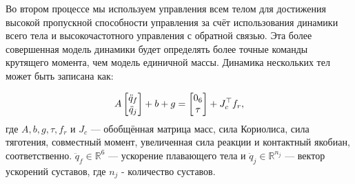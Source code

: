 Во втором процессе мы используем управления всем телом для достижения высокой пропускной способности управления за счёт использования динамики всего тела и высокочастотного управления с обратной связью. Эта более совершенная модель динамики будет определять более точные команды крутящего момента, чем модель единичной массы. Динамика нескольких тел может быть записана как:

\begin{equation}
	A \begin{bmatrix}
		\ddot{{q}}_f \\ \ddot{{q}}_j
	\end{bmatrix}
	+ b +g =
	\begin{bmatrix}
		0_6 \\ \tau
	\end{bmatrix} +
	J_c^\top f_r,
\end{equation}
где $A, b, g, \tau, f_r $ и $J_c$ --- обобщённая матрица масс, сила Кориолиса, сила тяготения, совместный момент, увеличенная сила реакции и контактный якобиан, соответственно. $\ddot{{q}}_f \in \mathbb{R}^{6}$ --- ускорение плавающего тела и  $\ddot{{q}}_j \in \mathbb{R}^{n_j}$ --- вектор ускорений суставов, где $n_j$ - количество суставов.
\FloatBarrier
